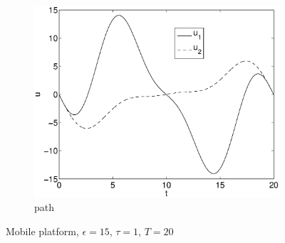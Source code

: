 \begin{figure}[h]
\begin{subfigure}[b]{\textwidth}
\centering
\includegraphics[height=0.3\textheight]{img/final_1_15_20_u.eps}
\caption{path}
\end{subfigure}
\caption{Mobile platform, $\epsilon=15$, $\tau=1$, $T=20$}
\label{fig:pl6}
\end{figure}

